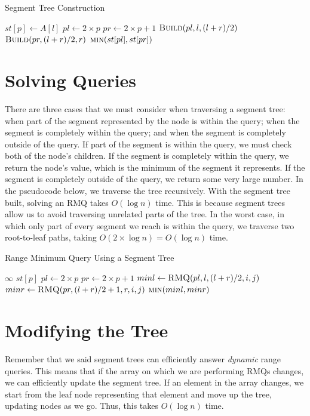 \documentclass[11pt]{article}
\begin{document}
\begin{algorithm}[H]
\caption{Segment Tree Construction}
\begin{algorithmic}
            \State $st[p] \gets A[l]$
        \Else
            \State $pl \gets 2 \times p$
            \State $pr \gets 2 \times p + 1$
            \State $\Call{Build}{pl, l, (l + r) / 2}$
            \State $\Call{Build}{pr, (l + r) / 2, r}$
            \State \Return $\Call{min}{st[pl], st[pr]}$
        \EndIf
    \EndFunction
\end{algorithmic}
\end{algorithm}

\section{Solving Queries}

There are three cases that we must consider when traversing a segment tree: when part of the segment represented by the node is within the query; when the segment is completely within the query; and when the segment is completely outside of the query. If part of the segment is within the query, we must check both of the node's children. If the segment is completely within the query, we return the node's value, which is the minimum of the segment it represents. If the segment is completely outside of the query, we return some very large number. In the pseudocode below, we traverse the tree recursively. With the segment tree built, solving an RMQ takes $O(\log n)$ time. This is because segment trees allow us to avoid traversing unrelated parts of the tree. In the worst case, in which only part of every segment we reach is within the query, we traverse two root-to-leaf paths, taking $O(2 \times \log n) = O(\log n)$ time.

\begin{algorithm}[H]
\caption{Range Minimum Query Using a Segment Tree}
\begin{algorithmic}
            \State \Return $\infty$
        \EndIf
            \State \Return $st[p]$
        \EndIf
        \State $pl \gets 2 \times p$
        \State $pr \gets 2 \times p + 1$
        \State $minl \gets \Call{RMQ}{pl, l, (l + r) / 2, i, j}$
        \State $minr \gets \Call{RMQ}{pr, (l + r) / 2 + 1, r, i, j}$
        \State \Return $\Call{min}{minl, minr}$
    \EndFunction
\end{algorithmic}
\end{algorithm}

\section{Modifying the Tree}

Remember that we said segment trees can efficiently answer \textit{dynamic} range queries. This means that if the array on which we are performing RMQs changes, we can efficiently update the segment tree. If an element in the array changes, we start from the leaf node representing that element and move up the tree, updating nodes as we go. Thus, this takes $O(\log n)$ time.
\end{document}
